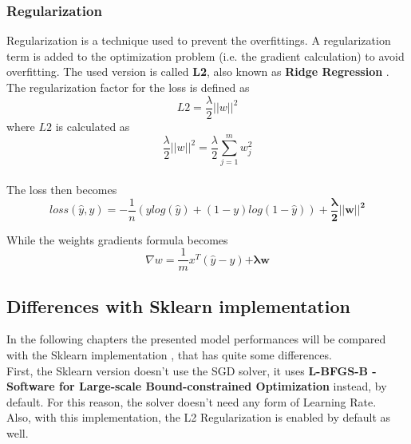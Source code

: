 \documentclass[
	letterpaper, %
	10pt, %
]{class}
\begin{document}
\subsubsection{Regularization}
Regularization is a technique used to prevent the overfittings. A regularization term is added to the optimization problem (i.e. the gradient calculation) to avoid overfitting.
The used version is called \textbf{L2}, also known as \textbf{Ridge Regression} \cite{l2}.\\

The regularization factor for the loss is defined as
$$ L2 = \frac{\lambda}{2}||w||^2 $$
where $L2$ is calculated as
$$ \frac{\lambda}{2}||w||^2 = \frac{\lambda}2{\displaystyle\sum_{j=1}^m w_j^2} $$ \\

The loss then becomes
$$ loss(\hat{y}, y) = -\frac{1}{n}(y log(\hat{y}) + (1-y)log(1-\hat{y})) + \boldsymbol{\frac{\lambda}{2}||w||^2} $$

While the weights gradients formula becomes
$$ \nabla w = \frac{1}{m}x^T(\hat{y} - y) \boldsymbol{+ \lambda w} $$

\subsection{Differences with Sklearn implementation}

In the following chapters the presented model performances will be compared with the Sklearn implementation \cite{logisticsklearn}, that has quite some differences.\\
First, the Sklearn version doesn't use the SGD solver, it uses \textbf{L-BFGS-B - Software for Large-scale Bound-constrained Optimization} \cite{lbfgsb} instead, by default.
For this reason, the solver doesn't need any form of Learning Rate.\\
Also, with this implementation, the L2 Regularization is enabled by default as well.


\end{document}
